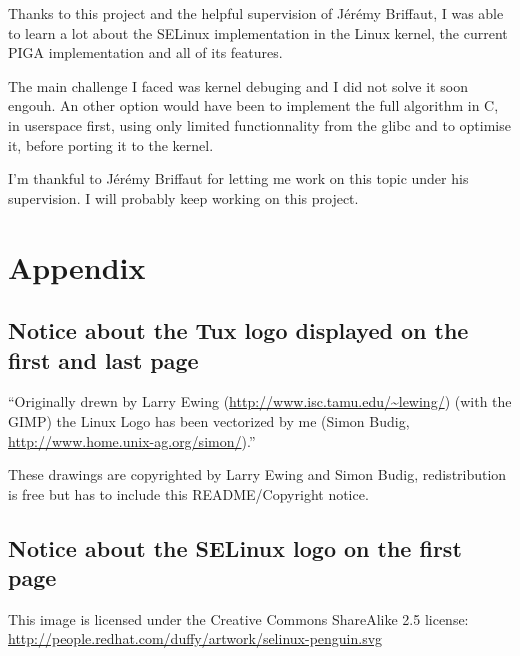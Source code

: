 \documentclass[pdftex,a4paper,titlepage,11pt]{article}
\newcommand{\lastPage}{
	\newpage
	\strut
	\fancyhf{}
	\renewcommand{\headrulewidth}{0pt}
	\addtocounter{page}{-1}
	\AddToShipoutPicture*{\BackgroundPic{Tux_n&b_half_1.png}}
	\newpage
}
\newcommand\BackgroundPic[1]{
	\put(0,-100){
		\parbox[b][\paperheight]{\paperwidth}{
			\vfill
			\centering
			\texttt{[image: \#1]}
			\vfill
		}
	}
}
\begin{document}
Thanks to this project and the helpful supervision of Jérémy Briffaut, I was
able to learn a lot about the SELinux implementation in the Linux kernel, the
current PIGA implementation and all of its features.

\bigskip

The main challenge I faced was kernel debuging and I did not solve it soon
engouh. An other option would have been to implement the full algorithm in C, in
userspace first, using only limited functionnality from the glibc and to
optimise it, before porting it to the kernel.

\bigskip

I'm thankful to Jérémy Briffaut for letting me work on this topic under his
supervision. I will probably keep working on this project.


\newpage


{}


\nocite{*}

\newpage

\section*{Appendix} 

\subsection*{Notice about the Tux logo displayed on the first and last page}
``Originally drewn by Larry Ewing (\url{http://www.isc.tamu.edu/~lewing/}) (with
the GIMP) the Linux Logo has been vectorized by me (Simon Budig,
\url{http://www.home.unix-ag.org/simon/}).''

\bigskip

These drawings are copyrighted by Larry Ewing and Simon Budig, redistribution is
free but has to include this README/Copyright notice.

\subsection*{Notice about the SELinux logo on the first page}
This image is licensed under the Creative Commons ShareAlike 2.5 license:
\url{http://people.redhat.com/duffy/artwork/selinux-penguin.svg}

\lastPage
\end{document}

